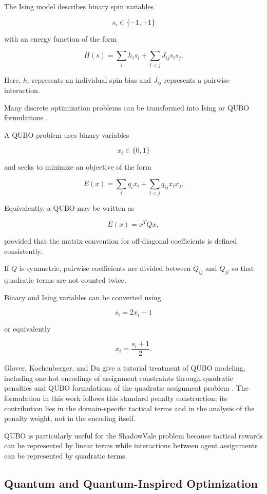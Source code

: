 \documentclass[12pt, a4paper]{article}
\begin{document}
The Ising model describes binary spin variables

$$
s_i \in \{-1,+1\}
$$

with an energy function of the form

$$
H(s)
=
\sum_i h_i s_i
+
\sum_{i<j} J_{ij}s_i s_j.
$$

Here, $h_i$ represents an individual spin bias and $J_{ij}$ represents a pairwise interaction.

Many discrete optimization problems can be transformed into Ising or QUBO formulations \cite{Lucas2014}.

A QUBO problem uses binary variables

$$
x_i \in \{0,1\}
$$

and seeks to minimize an objective of the form

$$
E(x)
=
\sum_i q_i x_i
+
\sum_{i<j} q_{ij}x_i x_j.
$$

Equivalently, a QUBO may be written as

$$
E(x)=x^TQx,
$$

provided that the matrix convention for off-diagonal coefficients is defined consistently.

If $Q$ is symmetric, pairwise coefficients are divided between $Q_{ij}$ and $Q_{ji}$ so that quadratic terms are not counted twice.

Binary and Ising variables can be converted using

$$
s_i = 2x_i-1
$$

or equivalently

$$
x_i = \frac{s_i+1}{2}.
$$


Glover, Kochenberger, and Du give a tutorial treatment of QUBO modeling, including one-hot encodings of assignment constraints through quadratic penalties and QUBO formulations of the quadratic assignment problem \cite{Glover2019}. The formulation in this work follows this standard penalty construction; its contribution lies in the domain-specific tactical terms and in the analysis of the penalty weight, not in the encoding itself.

QUBO is particularly useful for the ShadowVale problem because tactical rewards can be represented by linear terms while interactions between agent assignments can be represented by quadratic terms.

\subsection*{Quantum and Quantum-Inspired Optimization}
\end{document}
